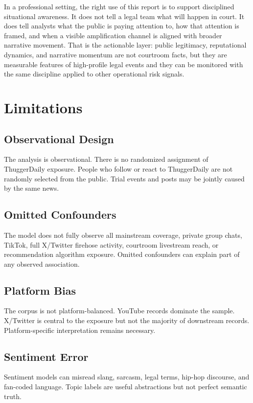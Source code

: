 \documentclass[12pt]{article}
\begin{document}
In a professional setting, the right use of this report is to support disciplined situational awareness. It does not tell a legal team what will happen in court. It does tell analysts what the public is paying attention to, how that attention is framed, and when a visible amplification channel is aligned with broader narrative movement. That is the actionable layer: public legitimacy, reputational dynamics, and narrative momentum are not courtroom facts, but they are measurable features of high-profile legal events and they can be monitored with the same discipline applied to other operational risk signals.

\newpage
\section{Limitations}
\subsection{Observational Design}
The analysis is observational. There is no randomized assignment of ThuggerDaily exposure. People who follow or react to ThuggerDaily are not randomly selected from the public. Trial events and posts may be jointly caused by the same news.

\subsection{Omitted Confounders}
The model does not fully observe all mainstream coverage, private group chats, TikTok, full X/Twitter firehose activity, courtroom livestream reach, or recommendation algorithm exposure. Omitted confounders can explain part of any observed association.

\subsection{Platform Bias}
The corpus is not platform-balanced. YouTube records dominate the sample. X/Twitter is central to the exposure but not the majority of downstream records. Platform-specific interpretation remains necessary.

\subsection{Sentiment Error}
Sentiment models can misread slang, sarcasm, legal terms, hip-hop discourse, and fan-coded language. Topic labels are useful abstractions but not perfect semantic truth.
\end{document}
